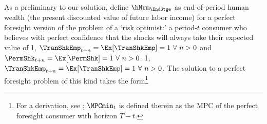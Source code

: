   As a preliminary to our solution, define $\hNrm_{\EndStge}$ as
  end-of-period human wealth (the present discounted value
  of future labor income) for a perfect foresight version of the problem
  of a `risk optimist:' a period-$t$ consumer who believes with perfect confidence
  that the shocks will always take their expected value of
  \PermShkOn
  {1, $\TranShkEmp_{t+n} = \Ex[\TranShkEmp]=1~\forall~n>0$ and $\PermShk_{t+n} = \Ex[\PermShk]=1~\forall~n>0$.}
  {1, $\TranShkEmp_{t+n} = \Ex[\TranShkEmp]=1~\forall~n>0$.}
  The solution to a perfect foresight problem of this kind takes the
  form\footnote{For a derivation, see \cite{BufferStockTheory}; $\MPCmin_{t}$ is defined therein as the MPC of the perfect foresight consumer with horizon $T-t$.}
